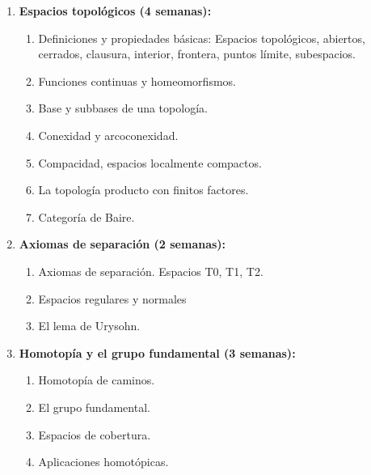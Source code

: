\begin{refsection}
\begin{enumerate}
\item \textbf{Espacios topológicos (4 semanas):} 
\begin{enumerate}
    \item Definiciones y propiedades básicas: Espacios topológicos, abiertos, cerrados, clausura, interior, frontera, puntos límite, subespacios.
    \item Funciones continuas y homeomorfismos.
    \item Base y subbases de una topología.
    \item Conexidad y arcoconexidad.
    \item Compacidad, espacios localmente compactos.
    \item La topología producto con finitos factores.
    \item Categoría de Baire.
\end{enumerate}

\item \textbf{Axiomas de separación (2 semanas):} 
\begin{enumerate}
    \item Axiomas de separación. Espacios T0, T1, T2.
    \item Espacios regulares y normales
    \item El lema de Urysohn.
\end{enumerate}

\item \textbf{Homotopía y el grupo fundamental (3 semanas):} 
\begin{enumerate}
    \item Homotopía de caminos.
    \item El grupo fundamental.
    \item Espacios de cobertura.
    \item Aplicaciones homotópicas.
\end{enumerate}




\end{enumerate}
\end{refsection}
